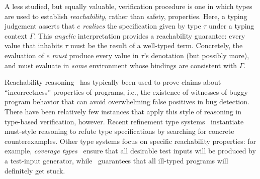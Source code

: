 A less studied, but equally valuable, verification procedure is one in
which types are used to establish \emph{reachability}, rather than
safety, properties.  Here, a typing judgement asserts that $e$
\emph{realizes} the specification given by type $\tau$ under a typing
context $\Gamma$.  This \emph{angelic} interpretation provides a
reachability guarantee: every value that inhabits $\tau$ must be the
result of a well-typed term.  Concretely, the evaluation of $e$
\emph{must} produce every value in $\tau$'s denotation (but possibly
more), and must evaluate in \emph{some} environment whose bindings are
consistent with $\Gamma$.

Reachability reasoning~\cite{ReverseHoareLogic, OHP19, ZDS23} has
typically been used to prove claims about ``incorrectness'' properties
of programs, i.e., the existence of witnesses of buggy program
behavior that can avoid overwhelming false positives in bug detection.
There have been relatively few instances that apply this style of
reasoning in type-based verification, however. Recent refinement type
systems~\cite{RefinementTypeSymbolicExecution,RefinementTypeRefutations}
instantiate must-style reasoning to refute type specifications by
searching for concrete counterexamples.  Other type systems focus on
specific reachability properties: for example, \emph{coverage
  types}~\cite{CoverageType} ensure that all desirable test inputs
will be produced by a test-input generator, while~\citet{Ill-types}
guarantees that all ill-typed programs will definitely get stuck.


